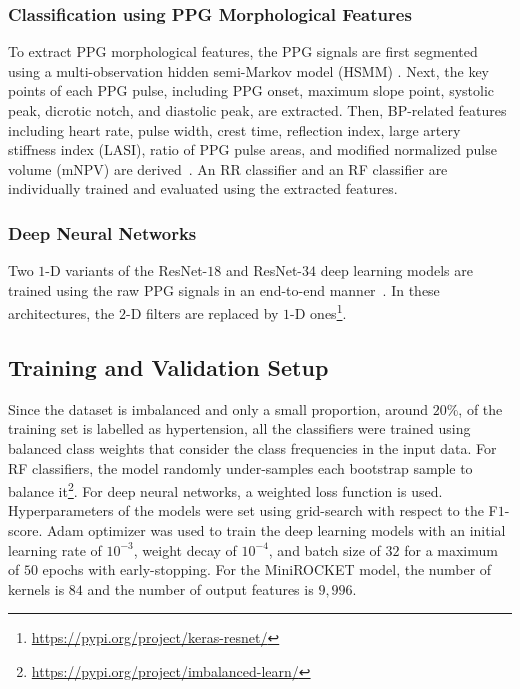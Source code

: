 \documentclass[letterpaper, 10 pt, conference]{ieeeconf}
\begin{document}
\subsubsection{Classification using PPG Morphological Features}
To extract PPG morphological features, the PPG signals are first segmented using a multi-observation hidden semi-Markov model (HSMM) \cite{hasanzadeh2023multi}. Next, the key points of each PPG pulse, including PPG onset, maximum slope point, systolic peak, dicrotic notch, and diastolic peak, are extracted. Then, BP-related features including heart rate, pulse width, crest time, reflection index, large artery stiffness index (LASI), ratio of PPG pulse areas, and modified normalized pulse volume (mNPV) are derived~\cite{kachuee2016cuffless, hasanzadeh2019blood, wang2023cuffless}.
An RR classifier and an RF classifier are individually trained and evaluated using the extracted features.


\subsubsection{Deep Neural Networks}
Two $1$-D variants of the ResNet-$18$ and ResNet-$34$ deep learning models are trained using the raw PPG signals in an end-to-end manner~\cite{he2016deep}. In these architectures, the $2$-D filters are replaced by $1$-D ones\footnote{\url{https://pypi.org/project/keras-resnet/}}.

\subsection{Training and Validation Setup}

Since the dataset is imbalanced and only a small proportion, around $20\%$, of the training set is labelled as hypertension, all the classifiers were trained using balanced class weights that consider the class frequencies in the input data. For RF classifiers, the model randomly under-samples each bootstrap sample to balance it\footnote{\url{https://pypi.org/project/imbalanced-learn/}}. For deep neural networks, a weighted loss function is used.
Hyperparameters of the models were set using grid-search with respect to the F$1$-score. Adam optimizer was used to train the deep learning models with an initial learning rate of $10^{-3}$, weight decay of $10^{-4}$, and batch size of $32$ for a maximum of $50$ epochs with early-stopping. 
For the MiniROCKET model, the number of kernels is $84$ and the number of output features is  $9,996$.
\end{document}
